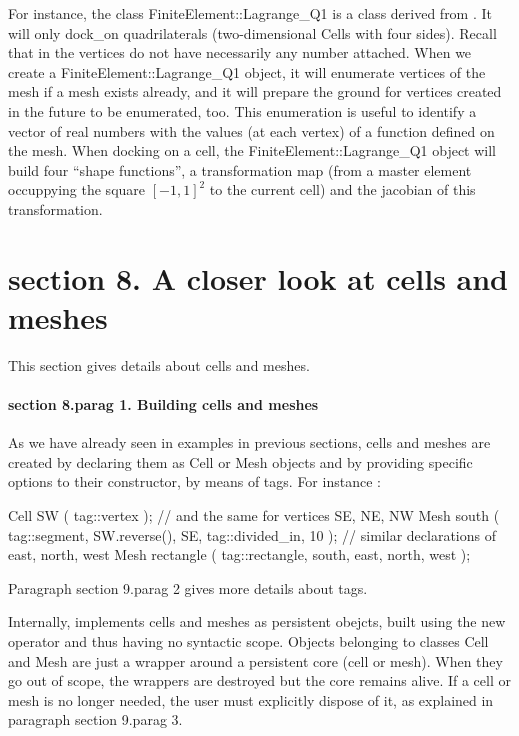 {For instance, the class {\codett FiniteElement::Lagrange\_Q1} is a class derived from
\hfil{}.
It will only {\codett dock\_on} quadrilaterals (two-dimensional {\codett Cell}s
with four sides).
Recall that in {\maniFEM} the vertices do not have necessarily any number attached.
When we create a {\codett FiniteElement::Lagrange\_Q1} object, it will enumerate vertices
of the mesh if a mesh exists already, and it will prepare the ground for vertices created
in the future to be enumerated, too.
This enumeration is useful to identify a vector of real numbers with the values
(at each vertex) of a function defined on the mesh.
When docking on a cell, the {\codett FiniteElement::Lagrange\_Q1} object will build four
``shape functions'', a transformation map (from a master element occuppying the square
$ [-1, 1]^2 $ to the current cell) and the jacobian of this transformation.





\section{\numb section 8. A closer look at cells and meshes}

This section gives details about cells and meshes.


\paragraph{\numb section 8.\numb parag 1. Building cells and meshes}

As we have already seen in examples in previous sections, cells and meshes are created
by declaring them as {\codett Cell} or {\codett Mesh} objects and by providing specific
options to their constructor, by means of {\codett tag}s. For instance :

\verbatim
   Cell SW ( tag::vertex ); // and the same for vertices SE, NE, NW
   Mesh south ( tag::segment, SW.reverse(), SE, tag::divided_in, 10 );
   // similar declarations of east, north, west
   Mesh rectangle ( tag::rectangle, south, east, north, west );
\endverbatim

Paragraph \numb section 9.\numb parag 2 gives more details about {\codett tag}s.

Internally, {\maniFEM} implements cells and meshes as persistent obejcts, built
using the {\codett new} operator and thus having no syntactic scope.
Objects belonging to classes {\codett Cell} and {\codett Mesh} are just a wrapper
around a persistent core (cell or mesh).
When they go out of scope, the wrappers are destroyed but the core remains alive.
If a cell or mesh is no longer needed, the user must explicitly dispose of it,
as explained in paragraph \numb section 9.\numb parag 3.

}

